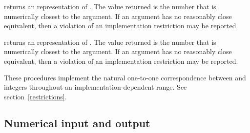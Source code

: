 \begin{entry}{%
}

 returns an  representation of .
The value returned is the
 number that is numerically closest to the argument.  
If an  argument has no reasonably close  equivalent,
then a violation of an implementation restriction may be reported.

 returns an  representation of
.  The value returned is the  number that is numerically
closest to the argument.
If an  argument has no reasonably close  equivalent,
then a violation of an implementation restriction may be reported.


These procedures implement the natural one-to-one correspondence between
 and  integers throughout an
implementation-dependent range.  See section~\ref{restrictions}.

\end{entry}

\medskip

\subsection{Numerical input and output}

